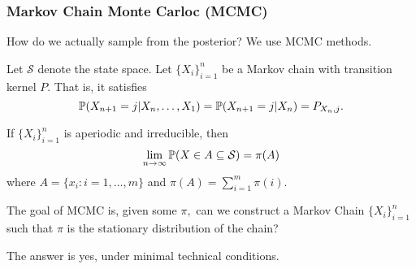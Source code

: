 \documentclass{chaistyle}
\begin{document}
\subsubsection*{Markov Chain Monte Carloc (MCMC)}
How do we actually sample from the posterior? We use MCMC methods.

Let \(\mathcal{S}\) denote the state space. Let \(\{X_i\}_{i=1}^n\) be a Markov chain with transition kernel \(P.\) That is, it satisfies \[\P(X_{n+1}=j|X_n,\dots,X_1)=\P(X_{n+1}=j|X_n)=P_{X_n,j}.\] 
\begin{theorem*}
    If \(\{X_i\}_{i=1}^n\) is aperiodic and irreducible, then \[\lim_{n \to \infty} \P(X\in A\subseteq\mathcal{S})=\pi(A)\] where \(A=\{x_{i}:i=1,\dots,m\}\) and \(\pi(A)=\sum_{i=1}^{m} \pi(i).\)
\end{theorem*}
The goal of MCMC is, given some \(\pi,\) can we construct a Markov Chain \(\{X_i\}_{i=1}^n\) such that \(\pi\) is the stationary distribution of the chain?

The answer is yes, under minimal technical conditions.
\end{document}
